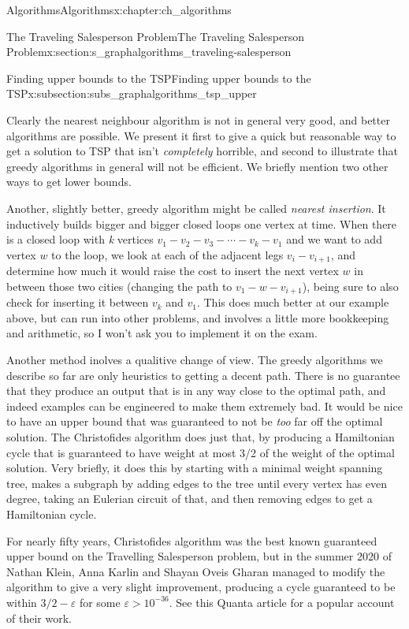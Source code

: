 \documentclass[oneside,10pt,]{book}
\numberwithin{equation}{section}
\begin{document}
\begin{chapterptx}{Algorithms}{}{Algorithms}{}{}{x:chapter:ch_algorithms}
\begin{sectionptx}{The Traveling Salesperson Problem}{}{The Traveling Salesperson Problem}{}{}{x:section:s_graphalgorithms_traveling-salesperson}
\begin{subsectionptx}{Finding upper bounds to the TSP}{}{Finding upper bounds to the TSP}{}{}{x:subsection:subs_graphalgorithms_tsp_upper}
\par
Clearly the nearest neighbour algorithm is not in general very good, and better algorithms are possible.  We present it first to give a quick but reasonable way to get a solution to TSP that isn't \emph{completely} horrible, and second to illustrate that greedy algorithms in general will not be efficient.  We briefly mention two other ways to get lower bounds.%
\par
Another, slightly better, greedy algorithm might be called \emph{nearest insertion}.  It inductively builds bigger and bigger closed loops one vertex at time.  When there is a closed loop with \emph{k} vertices \(v_1-v_2-v_3-\cdots - v_k-v_1\) and we want to add vertex \(w\) to the loop, we look at each of the adjacent legs \(v_i-v_{i+1}\), and determine how much it would raise the cost to insert the next vertex \(w\) in between those two cities (changing the path to \(v_1-w-v_{i+1}\)), being sure to also check for inserting it between \(v_k\) and \(v_1\).  This does much better at our example above, but can run into other problems, and involves a little more bookkeeping and arithmetic, so I won't ask you to implement it on the exam.%
\par
Another method inolves a qualitive change of view.  The greedy algorithms we describe so far are only heuristics to getting a decent path.  There is no guarantee that they produce an output that is in any way close to the optimal path, and indeed examples can be engineered to make them extremely bad.  It would be nice to have an upper bound that was guaranteed to not be \emph{too} far off the optimal solution.  The Christofides algorithm does just that, by producing a Hamiltonian cycle that is guaranteed to have weight at most 3\slash{}2 of the weight of the optimal solution.  Very briefly, it does this by starting with a minimal weight spanning tree, makes a subgraph by adding edges to the tree until every vertex has even degree, taking an Eulerian circuit of that, and then removing edges to get a Hamiltonian cycle.%
\par
For nearly fifty years, Christofides algorithm was the best known guaranteed upper bound on the Travelling Salesperson problem, but in the summer 2020 of Nathan Klein, Anna Karlin and Shayan Oveis Gharan managed to modify the algorithm to give a very slight improvement, producing a cycle guaranteed to be within \(3/2-\varepsilon\) for some \(\varepsilon>10^{-36}\).  See this Quanta article for a popular account of their work.%
\end{subsectionptx}

\end{sectionptx}
\end{chapterptx}
\end{document}
